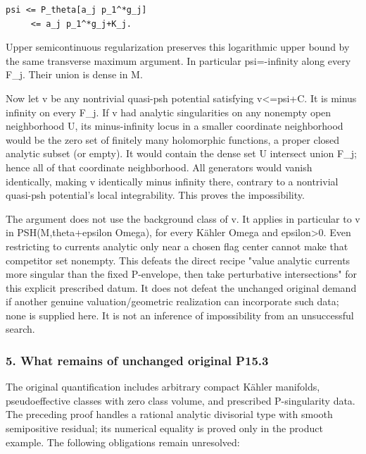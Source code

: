 \documentclass[11pt]{article}
\begin{document}
\begin{Verbatim}[breaklines=true,fontsize=\small]
psi <= P_theta[a_j p_1^*g_j]
     <= a_j p_1^*g_j+K_j.
\end{Verbatim}

Upper semicontinuous regularization preserves this logarithmic upper bound by the same transverse maximum argument. In particular psi=\allowbreak{}-\allowbreak{}infinity along every F\_\allowbreak{}j. Their union is dense in M.

Now let v be any nontrivial quasi-\allowbreak{}psh potential satisfying v<=\allowbreak{}psi+C. It is minus infinity on every F\_\allowbreak{}j. If v had analytic singularities on any nonempty open neighborhood U, its minus-\allowbreak{}infinity locus in a smaller coordinate neighborhood would be the zero set of finitely many holomorphic functions, a proper closed analytic subset (or empty). It would contain the dense set U intersect union F\_\allowbreak{}j; hence all of that coordinate neighborhood. All generators would vanish identically, making v identically minus infinity there, contrary to a nontrivial quasi-\allowbreak{}psh potential's local integrability. This proves the impossibility.

The argument does not use the background class of v. It applies in particular to v in PSH(M,theta+epsilon Omega), for every Kähler Omega and epsilon>0. Even restricting to currents analytic only near a chosen flag center cannot make that competitor set nonempty. This defeats the direct recipe "value analytic currents more singular than the fixed P-\allowbreak{}envelope, then take perturbative intersections" for this explicit prescribed datum. It does not defeat the unchanged original demand if another genuine valuation/\allowbreak{}geometric realization can incorporate such data; none is supplied here. It is not an inference of impossibility from an unsuccessful search.

\subsubsection{5. What remains of unchanged original P15.3}

The original quantification includes arbitrary compact Kähler manifolds, pseudoeffective classes with zero class volume, and prescribed P-\allowbreak{}singularity data. The preceding proof handles a rational analytic divisorial type with smooth semipositive residual; its numerical equality is proved only in the product example. The following obligations remain unresolved:
\end{document}
